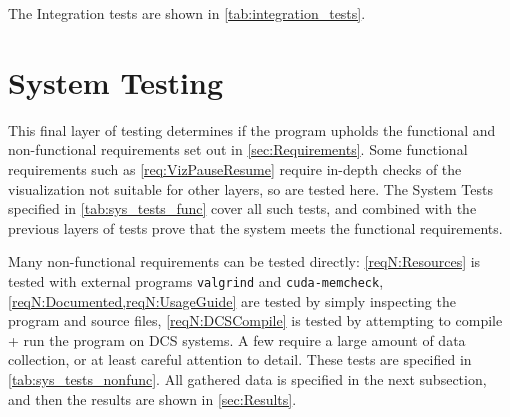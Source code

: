 The Integration tests are shown in \cref{tab:integration_tests}.



\section{System Testing}
This final layer of testing determines if the program upholds the functional and non-functional requirements set out in \cref{sec:Requirements}.
Some functional requirements such as \cref{req:VizPauseResume} require in-depth checks of the visualization not suitable for other layers, so are tested here.
The System Tests specified in \cref{tab:sys_tests_func} cover all such tests, and combined with the previous layers of tests prove that the system meets the functional requirements.

Many non-functional requirements can be tested directly: \cref{reqN:Resources} is tested with external programs \texttt{valgrind} and \texttt{cuda-memcheck}, \cref{reqN:Documented,reqN:UsageGuide} are tested by simply inspecting the program and source files, \cref{reqN:DCSCompile} is tested by attempting to compile + run the program on DCS systems.
A few require a large amount of data collection, or at least careful attention to detail.
These tests are specified in \cref{tab:sys_tests_nonfunc}.
All gathered data is specified in the next subsection, and then the results are shown in \cref{sec:Results}.






